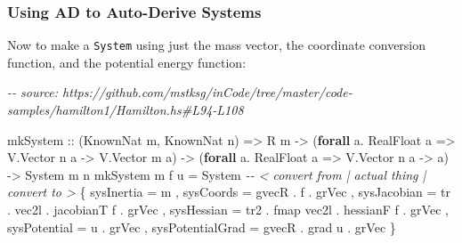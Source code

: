 \documentclass[]{article}
\newenvironment{Shaded}{}{}
\newcommand{\CommentTok}[1]{\textcolor[rgb]{0.38,0.63,0.69}{\textit{#1}}}
\newcommand{\DataTypeTok}[1]{\textcolor[rgb]{0.56,0.13,0.00}{#1}}
\newcommand{\FunctionTok}[1]{\textcolor[rgb]{0.02,0.16,0.49}{#1}}
\newcommand{\KeywordTok}[1]{\textcolor[rgb]{0.00,0.44,0.13}{\textbf{#1}}}
\newcommand{\NormalTok}[1]{#1}
\newcommand{\OperatorTok}[1]{\textcolor[rgb]{0.40,0.40,0.40}{#1}}
\newcommand{\OtherTok}[1]{\textcolor[rgb]{0.00,0.44,0.13}{#1}}
\begin{document}
\subsubsection{Using AD to Auto-Derive
Systems}\label{using-ad-to-auto-derive-systems}

Now to make a \texttt{System} using just the mass vector, the coordinate
conversion function, and the potential energy function:

\begin{Shaded}
\begin{Highlighting}[]
\CommentTok{{-}{-} source: https://github.com/mstksg/inCode/tree/master/code{-}samples/hamilton1/Hamilton.hs\#L94{-}L108}

\NormalTok{mkSystem}
\OtherTok{    ::}\NormalTok{ (}\DataTypeTok{KnownNat}\NormalTok{ m, }\DataTypeTok{KnownNat}\NormalTok{ n)}
    \OtherTok{=\textgreater{}} \DataTypeTok{R}\NormalTok{ m}
    \OtherTok{{-}\textgreater{}}\NormalTok{ (}\KeywordTok{forall}\NormalTok{ a}\OperatorTok{.} \DataTypeTok{RealFloat}\NormalTok{ a }\OtherTok{=\textgreater{}} \DataTypeTok{V.Vector}\NormalTok{ n a }\OtherTok{{-}\textgreater{}} \DataTypeTok{V.Vector}\NormalTok{ m a)}
    \OtherTok{{-}\textgreater{}}\NormalTok{ (}\KeywordTok{forall}\NormalTok{ a}\OperatorTok{.} \DataTypeTok{RealFloat}\NormalTok{ a }\OtherTok{=\textgreater{}} \DataTypeTok{V.Vector}\NormalTok{ n a }\OtherTok{{-}\textgreater{}}\NormalTok{ a)}
    \OtherTok{{-}\textgreater{}} \DataTypeTok{System}\NormalTok{ m n}
\NormalTok{mkSystem m f u }\OtherTok{=} \DataTypeTok{System}
                    \CommentTok{{-}{-} \textless{} convert from      | actual thing | convert to \textgreater{}}
\NormalTok{    \{ sysInertia       }\OtherTok{=}\NormalTok{                     m}
\NormalTok{    , sysCoords        }\OtherTok{=}\NormalTok{        gvecR      }\OperatorTok{.}\NormalTok{ f            }\OperatorTok{.}\NormalTok{ grVec}
\NormalTok{    , sysJacobian      }\OtherTok{=}\NormalTok{ tr   }\OperatorTok{.}\NormalTok{ vec2l      }\OperatorTok{.}\NormalTok{ jacobianT f  }\OperatorTok{.}\NormalTok{ grVec}
\NormalTok{    , sysHessian       }\OtherTok{=}\NormalTok{ tr2  }\OperatorTok{.} \FunctionTok{fmap}\NormalTok{ vec2l }\OperatorTok{.}\NormalTok{ hessianF f   }\OperatorTok{.}\NormalTok{ grVec}
\NormalTok{    , sysPotential     }\OtherTok{=}\NormalTok{                     u            }\OperatorTok{.}\NormalTok{ grVec}
\NormalTok{    , sysPotentialGrad }\OtherTok{=}\NormalTok{        gvecR      }\OperatorTok{.}\NormalTok{ grad u       }\OperatorTok{.}\NormalTok{ grVec}
\NormalTok{    \}}
\end{Highlighting}
\end{Shaded}
\end{document}
